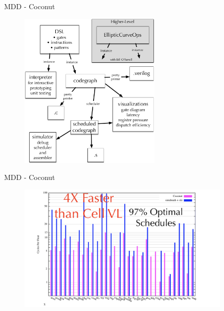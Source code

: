 \documentclass[presentation]{beamer}
\begin{document}
\begin{frame}{MDD - Coconut}
\begin{figure}
\includegraphics[width=0.6\textwidth]{figs/Coconut.pdf}
\end{figure}
\end{frame}

\begin{frame}{MDD - Coconut}
\begin{figure}
\includegraphics[width=0.9\textwidth]{figs/CoconutFaster.png}
\end{figure}
\end{frame}
\end{document}
